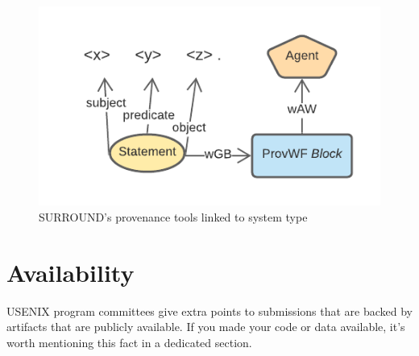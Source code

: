 \documentclass[letterpaper,twocolumn,10pt]{article}
\begin{document}
\begin{figure}
  \begin{center}
    \includegraphics[width=\textwidth]{images/reified-graph-data.png}
  \end{center}
  \caption{\label{fig:reified-graph-data} SURROUND's provenance tools linked to system type}
  \end{figure}



\section*{Availability}

USENIX program committees give extra points to submissions that are
backed by artifacts that are publicly available. If you made your code
or data available, it's worth mentioning this fact in a dedicated
section.


% 


\end{document}
